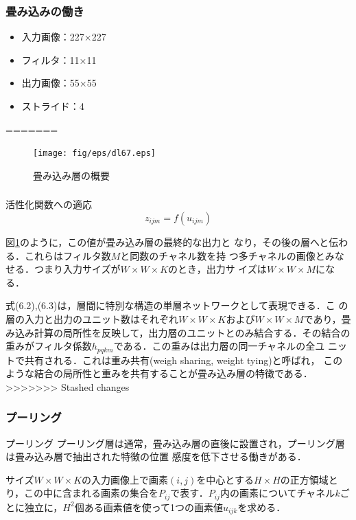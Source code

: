 \documentclass[dvipdfmx,11pt,notheorems]{beamer}
\theoremstyle{definition}
\begin{document}
\begin{frame}[fragile]\frametitle{畳み込みの働き}

\begin{itemize}
 \item 入力画像：227×227
 \item フィルタ：11×11
 \item 出力画像：55×55
 \item ストライド：4
\end{itemize}
=======
\begin{figure}[t]
 \centering
 \texttt{[image: fig/eps/dl67.eps]}
  \caption{畳み込み層の概要}
  \label{fig:畳み込み層の概要}
\end{figure}

\begin{frame}[fragile]\frametitle{}
\begin{block}{活性化関数への適応}
\begin{equation}
 z_{ijm}=f(u_{ijm})
\end{equation}
\end{block}

図\ref{fig:畳み込み層の概要}のように，この値が畳み込み層の最終的な出力と
なり，その後の層へと伝わる．これらはフィルタ数$M$と同数のチャネル数を持
つ多チャネルの画像とみなせる．つまり入力サイズが$W\times W\times K$のとき，出力サ
イズは$W\times W\times M$になる．

式(6.2),(6.3)は，層間に特別な構造の単層ネットワークとして表現できる．こ
の層の入力と出力のユニット数はそれぞれ$W\times W\times K$および$W\times W\times M$であり，畳
み込み計算の局所性を反映して，出力層のユニットとのみ結合する．その結合の
重みがフィルタ係数$h_{pqkm}$である．この重みは出力層の同一チャネルの全ユ
ニットで共有される．これは重み共有(weigh sharing, weight tying)と呼ばれ，
このような結合の局所性と重みを共有することが畳み込み層の特徴である．
>>>>>>> Stashed changes

\end{frame}



\begin{frame}[fragile]\frametitle{プーリング}
\begin{block}{プーリング}
プーリング層は通常，畳み込み層の直後に設置され，プーリング層は畳み込み層で抽出された特徴の位置
感度を低下させる働きがある．
\end{block}
サイズ$W \times W \times K$の入力画像上で画素$(i,j)$を中心とする$H\times H$の正方領域とり，この中に含まれる画素の集合を$P_{ij}$で表す．$P_{ij}$内の画素についてチャネル$k$ごとに独立に，$H^2$個ある画素値を使って1つの画素値$u_{ijk}$を求める．


\end{frame}
\end{frame}
\end{document}
